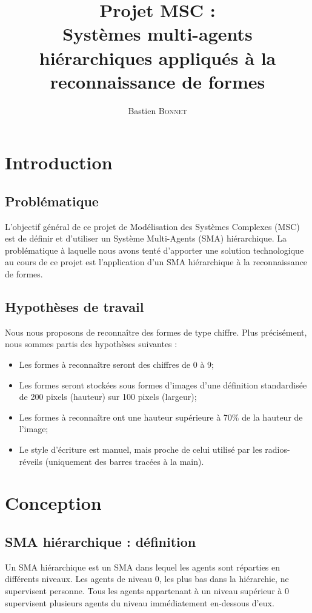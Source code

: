 \documentclass[a4paper,12pt]{report}
\title{Projet MSC : \\ Systèmes multi-agents hiérarchiques appliqués à la reconnaissance de formes}
\author{Bastien \textsc{Bonnet}}
\begin{document}

\maketitle


\tableofcontents

\chapter{Introduction}

\section{Problématique}
L'objectif général de ce projet de Modélisation des Systèmes Complexes (MSC) est de définir et d'utiliser un Système Multi-Agents (SMA) hiérarchique. La problématique à laquelle nous avons tenté d'apporter une solution technologique au cours de ce projet est l'application d'un SMA hiérarchique à la reconnaissance de formes.

\section{Hypothèses de travail}
Nous nous proposons de reconnaître des formes de type chiffre. Plus précisément, nous sommes partis des hypothèses suivantes :
\begin{itemize}
 \item Les formes à reconnaître seront des chiffres de 0 à 9;
 \item Les formes seront stockées sous formes d'images d'une définition standardisée de 200 pixels (hauteur) sur 100 pixels (largeur);
 \item Les formes à reconnaître ont une hauteur supérieure à 70\% de la hauteur de l'image;
 \item Le style d'écriture est manuel, mais proche de celui utilisé par les radios-réveils (uniquement des barres tracées à la main).
\end{itemize}


\chapter{Conception}
\section{SMA hiérarchique : définition}
Un SMA hiérarchique est un SMA dans lequel les agents sont réparties en différents niveaux. Les agents de niveau 0, les plus bas dans la hiérarchie, ne supervisent personne. Tous les agents appartenant à un niveau supérieur à 0 supervisent plusieurs agents du niveau immédiatement en-dessous d'eux.
\end{document}

